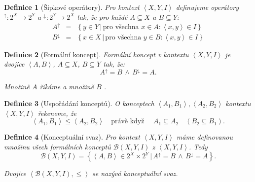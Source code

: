 \documentclass{article}
\newcommand{\sep}{\,|\,}
\newcommand{\foreach}{\mbox{pro všechna }}
\newcommand{\pravekdyz}{\mbox{právě když }}
\newcommand{\adds}[1]{\left\{#1\right\}}
\newcommand{\addsp}[1]{\left<#1\right>}
\newcommand{\logand}{\,\wedge\,}
\DeclareMathOperator{\ext}{Ext}
\DeclareMathOperator{\intfca}{Int}
\newcommand{\context}{\addsp{X, Y, I}}
\newcommand{\lattice}{\mathcal{B}(X, Y, I)}
\newcommand{\AB}{\addsp{A, B}}
\newcommand{\up}{^{\uparrow}}
\newcommand{\down}{^{\downarrow}}
\newtheorem{mydef}{Definice}
\newtheorem{theorem}[mydef]{Věta}
\begin{document}
\begin{mydef}[Šipkové operátory]
Pro kontext $\context$ definujeme operátory $\up:2^X\rightarrow2^Y$ a $\down:2^Y\rightarrow2^X$ tak, že pro každé $A\subseteq X$ a $B\subseteq Y$:
\begin{eqnarray}
A\up&=&\adds{y\in Y\sep \foreach x \in A: \addsp{x, y}\in I}\\
B\down&=&\adds{x\in X\sep\foreach y\in B:\addsp{x, y} \in I}
\end{eqnarray}
\end{mydef}


\begin{mydef}[Formální koncept]
Formální koncept v kontextu $\context$ je dvojice $\AB$, $A\subseteq X$, $B\subseteq Y$ tak, že:
$$A\up=B\logand B\down =A.$$

Množině $A$ říkáme  a množině $B$ .
\end{mydef}

\begin{mydef}[Uspořádání konceptů]
\label{def.order}
O konceptech $\addsp{A_1, B_1}, \addsp{A_2, B_2}$ kontextu $\context$ řekeneme, že
$$\addsp{A_1, B_1}\le\addsp{A_2, B_2}\quad\pravekdyz\quad A_1\subseteq A_2 \quad(B_2\subseteq B_1).$$
\end{mydef}

\begin{mydef}[Konceptuální svaz]
Pro kontext $\context$ máme definovanou množinu všech formálních konceptů $\lattice$ z $\context$. Tedy
$$\lattice=\adds{\addsp{A, B}\in 2^X\times 2^Y\sep A\up=B\logand B\down=A}.$$

Dvojice $\addsp{\lattice, \le}$ se nazývá konceptuální svaz. 
\end{mydef}

\end{document}
